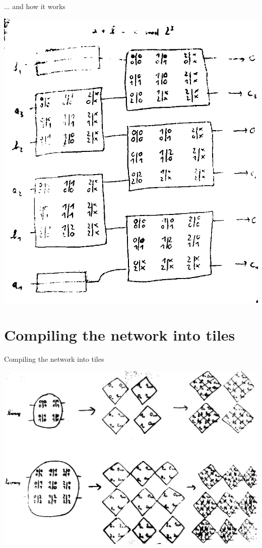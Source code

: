 \documentclass{beamer}
\begin{document}
\begin{frame}{... and how it works}
	\begin{center}
	\includegraphics[scale=0.23]{binary_additioner}
	\end{center}
\end{frame}


\section{Compiling the network into tiles}

\begin{frame}{Compiling the network into tiles}
	\begin{center}
		\includegraphics[scale=0.15]{compile}
	\end{center}
\end{frame}
\end{document}
